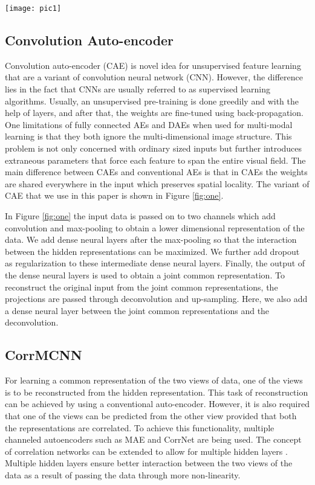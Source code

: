 \documentclass[10pt, a4paper, conference, compsocconf]{IEEEtran}
\begin{document}
\begin{figure*}
\centering\texttt{[image: pic1]}
\caption{Overview of the CorrMCNN. The bidirectional arrows shows the step correlation computation and cross-reconstructions at the intermediate steps.}
\label{fig:one}
\end{figure*}

\subsection{Convolution Auto-encoder}
Convolution auto-encoder (CAE) \cite{masci2011cae} is novel idea for unsupervised feature learning that are a variant of convolution neural network (CNN). However, the difference lies in the fact that CNNs are usually referred to as supervised learning algorithms. Usually, an unsupervised pre-training is done greedily and with the help of layers, and after that, the weights are fine-tuned using back-propagation. One limitations of fully connected AEs and DAEs when used for multi-modal learning is that they both ignore the multi-dimensional image structure. This problem is not only concerned with ordinary sized inputs but further introduces extraneous parameters that force each feature to span the entire visual field. The main difference between CAEs and conventional AEs is that in CAEs the weights are shared everywhere in the input which preserves spatial locality. The variant of CAE that we use in this paper is shown in Figure \ref{fig:one}.

In Figure \ref{fig:one} the input data is passed on to two channels which add convolution and max-pooling to obtain a lower dimensional representation of the data. We add dense neural layers after the max-pooling so that the interaction between the hidden representations can be maximized. We further add dropout as regularization to these intermediate dense neural layers. Finally, the output of the dense neural layers is used to obtain a joint common representation. To reconstruct the original input from the joint common representations, the projections are passed through deconvolution and up-sampling. Here, we also add a dense neural layer between the joint common representations and the deconvolution. 

\subsection{CorrMCNN}
For learning a common representation of the two views of data, one of the views is to be reconstructed from the hidden representation. This task of reconstruction can be achieved by using a conventional auto-encoder. However, it is also required that one of the views can be predicted from the other view provided that both the representations are correlated. To achieve this functionality, multiple channeled autoencoders such as MAE and CorrNet are being used. The concept of correlation networks can be extended to allow for multiple hidden layers \cite{chandar2016correlational}. Multiple hidden layers ensure better interaction between the two views of the data as a result of passing the data through more non-linearity.
\end{document}
